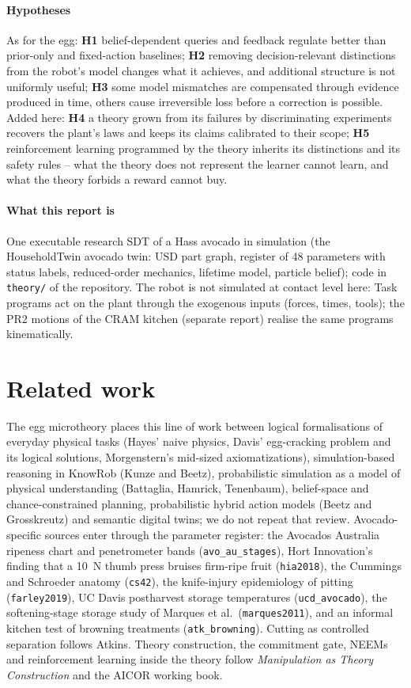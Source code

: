 \documentclass[10.5pt,a4paper]{article}
\begin{document}
\paragraph{Hypotheses} As for the egg: \textbf{H1} belief-dependent queries and feedback regulate better than prior-only
and fixed-action baselines; \textbf{H2} removing decision-relevant distinctions from the robot's model changes what
it achieves, and additional structure is not uniformly useful; \textbf{H3} some model mismatches are compensated
through evidence produced in time, others cause irreversible loss before a correction is possible. Added here:
\textbf{H4} a theory grown from its failures by discriminating experiments recovers the plant's laws and keeps its
claims calibrated to their scope; \textbf{H5} reinforcement learning programmed by the theory inherits its
distinctions and its safety rules -- what the theory does not represent the learner cannot learn, and what the theory
forbids a reward cannot buy.

\paragraph{What this report is} One executable research SDT of a Hass avocado in simulation (the HouseholdTwin
avocado twin: USD part graph, register of 48 parameters with status labels,
reduced-order mechanics, lifetime model, particle belief); code in \texttt{theory/} of the repository. The robot is
not simulated at contact level here: Task programs act on the plant through the exogenous inputs (forces, times,
tools); the PR2 motions of the CRAM kitchen (separate report) realise the same programs kinematically.
\section{Related work}
The egg microtheory places this line of work between logical formalisations of everyday physical tasks (Hayes'
naive physics, Davis' egg-cracking problem and its logical solutions, Morgenstern's mid-sized axiomatizations),
simulation-based reasoning in KnowRob (Kunze and Beetz), probabilistic simulation as a model of physical
understanding (Battaglia, Hamrick, Tenenbaum), belief-space and chance-constrained planning, probabilistic hybrid
action models (Beetz and Grosskreutz) and semantic digital twins; we do not repeat that review. Avocado-specific
sources enter through the parameter register: the Avocados Australia ripeness chart and penetrometer bands
(\texttt{avo\_au\_stages}), Hort Innovation's finding that a 10~N thumb press bruises firm-ripe fruit
(\texttt{hia2018}), the Cummings and Schroeder anatomy (\texttt{cs42}), the knife-injury epidemiology of pitting
(\texttt{farley2019}), UC Davis postharvest storage temperatures (\texttt{ucd\_avocado}), the softening-stage storage
study of Marques et al.\ (\texttt{marques2011}), and an informal kitchen test of browning treatments
(\texttt{atk\_browning}). Cutting as controlled separation follows Atkins. Theory construction, the commitment gate,
NEEMs and reinforcement learning inside the theory follow \emph{Manipulation as Theory Construction} and the AICOR
working book.
\end{document}
